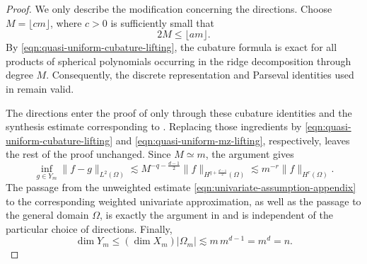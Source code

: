 \documentclass{article}
\numberwithin{equation}{section}
\begin{document}
\begin{proof}
We only describe the modification concerning the directions. Choose $M=\lfloor cm\rfloor$, where $c>0$ is sufficiently small that
$$
2M\leq\lfloor am\rfloor.
$$
By \eqref{eqn:quasi-uniform-cubature-lifting}, the cubature formula is exact for all products of spherical polynomials occurring in the ridge decomposition through degree $M$. Consequently, the discrete representation and Parseval identities used in \cite[(4.22)--(4.23)]{petrushev1998approximation} remain valid.

The directions enter the proof of \cite[Theorem~7.1]{petrushev1998approximation} only through these cubature identities and the synthesis estimate corresponding to \cite[Lemmas~4.2--4.4]{petrushev1998approximation}. Replacing those ingredients by \eqref{eqn:quasi-uniform-cubature-lifting} and \eqref{eqn:quasi-uniform-mz-lifting}, respectively, leaves the rest of the proof unchanged. Since $M\simeq m$, the argument gives
$$
\inf_{g\in Y_m}\|f-g\|_{L^2(\Omega)}
\lesssim
M^{-q-\frac{d-1}{2}}
\|f\|_{H^{q+\frac{d-1}{2}}(\Omega)}
\lesssim
m^{-r}\|f\|_{H^r(\Omega)}.
$$
The passage from the unweighted estimate \eqref{eqn:univariate-assumption-appendix} to the corresponding weighted univariate approximation, as well as the passage to the general domain $\Omega$, is exactly the argument in \cite[Section~8 and Theorem~8.2]{petrushev1998approximation} and is independent of the particular choice of directions. Finally,
$$
\dim Y_m
\leq
(\dim X_m)|\Omega_m|
\lesssim
m\,m^{d-1}
=
m^d=n.
$$
\end{proof}



	
\end{document}
